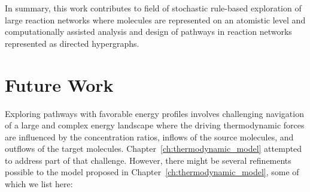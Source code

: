 In summary, this work contributes to field of stochastic rule-based exploration of large reaction networks where molecules are represented on an atomistic level and computationally assisted analysis and design of pathways in reaction networks represented as directed hypergraphs.


\section{Future Work}

Exploring pathways with favorable energy profiles involves challenging navigation of a large and complex energy landscape where the driving thermodynamic forces are influenced by the concentration ratios, inflows of the source molecules, and outflows of the target molecules.
Chapter~\ref{ch:thermodynamic_model} attempted to address part of that challenge.
However, there might be several refinements possible to the model proposed in Chapter~\ref{ch:thermodynamic_model}, some of which we list here:
